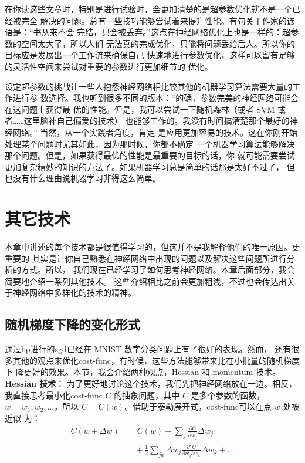 在你读这些文章时，特别是进行试验时，会更加清楚的是超参数优化就不是一个已经被完全
解决的问题。总有一些技巧能够尝试着来提升性能。有句关于作家的谚语是：“书从来不会
完结，只会被丢弃。”这点在神经网络优化上也是一样的：超参数的空间太大了，所以人们
无法真的完成优化，只能将问题丢给后人。所以你的目标应是发展出一个工作流来确保自己
快速地进行参数优化，这样可以留有足够的灵活性空间来尝试对重要的参数进行更加细节的
优化。

设定超参数的挑战让一些人抱怨神经网络相比较其他的机器学习算法需要大量的工作进行参
数选择。我也听到很多不同的版本：“的确，参数完美的神经网络可能会在这问题上获得最
优的性能。但是，我可以尝试一下随机森林（或者 SVM 或者……这里脑补自己偏爱的技术）
也能够工作的。我没有时间搞清楚那个最好的神经网络。” 当然，从一个实践者角度，肯定
是应用更加容易的技术。这在你刚开始处理某个问题时尤其如此，因为那时候，你都不确定
一个机器学习算法能够解决那个问题。但是，如果获得最优的性能是最重要的目标的话，你
就可能需要尝试更加复杂精妙的知识的方法了。如果机器学习总是简单的话那是太好不过了，
但也没有什么理由说机器学习非得这么简单。

\section{其它技术}
\label{sec:other_techniques}

本章中讲述的每个技术都是很值得学习的，但这并不是我解释他们的唯一原因。更重要的
其实是让你自己熟悉在神经网络中出现的问题以及解决这些问题所进行分析的方式。所以，
我们现在已经学习了如何思考神经网络。本章后面部分，我会简要地介绍一系列其他技术。
这些介绍相比之前会更加粗浅，不过也会传达出关于神经网络中多样化的技术的精神。

\subsection{随机梯度下降的变化形式}

通过\gls*{bp}进行的\gls*{sgd}已经在 MNIST 数字分类问题上有了很好的表现。然而，
还有很多其他的观点来优化\gls*{cost-func}，有时候，这些方法能够带来比在小批量的随机梯度下
降更好的效果。本节，我会介绍两种观点，Hessian 和 momentum 技术。\\

\textbf{Hessian 技术：} 为了更好地讨论这个技术，我们先把神经网络放在一边。相反，
我直接思考最小化\gls*{cost-func} $C$ 的抽象问题，其中 $C$ 是多个参数的函数，
$w=w_1,w_2,\ldots$，所以 $C=C(w)$。借助于泰勒展开式，\gls*{cost-func}可以在点 $w$ 处被近似
为：
\begin{align}
  C(w+\Delta w) &= C(w) + \sum_j \frac{\partial C}{\partial w_j} \Delta w_j \nonumber \\
     & \quad + \frac{1}{2} \sum_{jk} \Delta w_j \frac{\partial^2 C}{\partial w_j \partial w_k} \Delta w_k + \ldots \label{eq:103}\tag{103}
\end{align}

